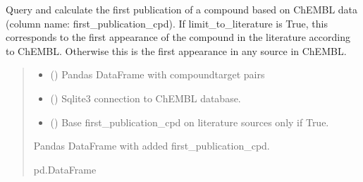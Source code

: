 \documentclass[letterpaper,10pt,english]{sphinxmanual}
\begin{document}

\begin{fulllineitems}
\label{\detokenize{add_chembl_compound_properties:add_chembl_compound_properties.add_first_publication_date}}
\pysigstartsignatures
{}
\pysigstopsignatures
\sphinxAtStartPar
Query and calculate the first publication of a compound based on ChEMBL data (column name: first\_publication\_cpd).
If limit\_to\_literature is True, this corresponds to the first appearance of the compound in the literature according to ChEMBL.
Otherwise this is the first appearance in any source in ChEMBL.
\begin{quote}\begin{description}
\begin{itemize}
\item {} 
\sphinxAtStartPar
{} () \textendash{} Pandas DataFrame with compound\sphinxhyphen{}target pairs

\item {} 
\sphinxAtStartPar
{} () \textendash{} Sqlite3 connection to ChEMBL database.

\item {} 
\sphinxAtStartPar
{} () \textendash{} Base first\_publication\_cpd on literature sources only if True.

\end{itemize}

\sphinxAtStartPar
Pandas DataFrame with added first\_publication\_cpd.

\sphinxAtStartPar
pd.DataFrame

\end{description}\end{quote}

\end{fulllineitems}
\end{document}

